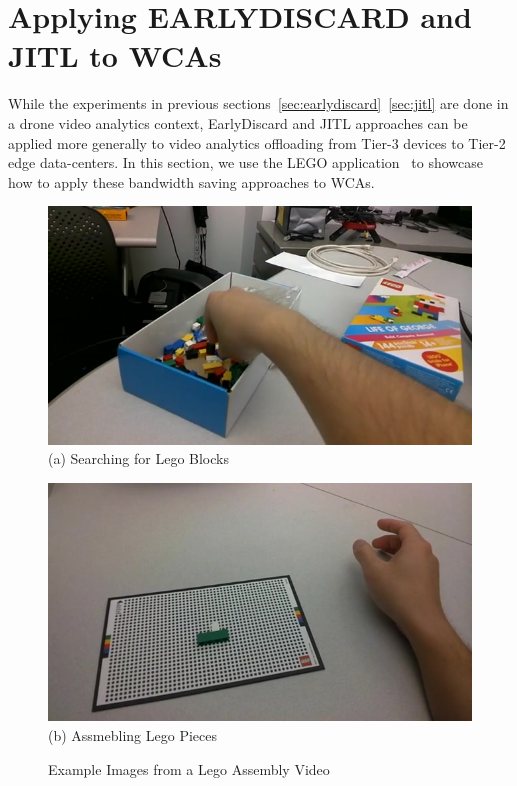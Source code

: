 \section{Applying {\xc EARLYDISCARD} and {\xc JITL} to WCAs}
\label{bw:wca}

While the experiments in previous sections~\ref{sec:earlydiscard}~\ref{sec:jitl}
are done in a drone video analytics context, EarlyDiscard and JITL approaches
can be applied more generally to video analytics offloading from Tier-3 devices
to Tier-2 edge data-centers. In this section, we use the LEGO
application~\cite{chen2018application} to showcase how to apply these bandwidth
saving approaches to WCAs.

\begin{figure}
\centering
\begin{minipage}[]{0.45\linewidth}
\centering
    \includegraphics[width=\linewidth]{FIGS/lego-search}\\
{(a) Searching for Lego Blocks}
\end{minipage}
\begin{minipage}[]{0.45\linewidth}
\centering
\includegraphics[width=\linewidth]{FIGS/lego-assembled}\\
{(b) Assmebling Lego Pieces}
\end{minipage}
\caption{Example Images from a Lego Assembly Video}
\label{fig:wca-lego-example-images}
\end{figure}

